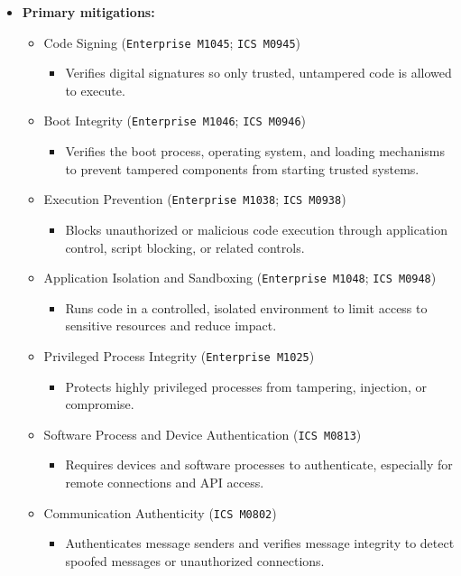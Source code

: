 \documentclass[10pt,a4paper,oneside]{report}
\begin{document}
\begin{itemize}
\item \textbf{Primary mitigations:}
\begin{itemize}
\item Code Signing (\texttt{Enterprise M1045}; \texttt{ICS M0945})
\begin{itemize}
\item Verifies digital signatures so only trusted, untampered code is allowed to execute.
\end{itemize}
\item Boot Integrity (\texttt{Enterprise M1046}; \texttt{ICS M0946})
\begin{itemize}
\item Verifies the boot process, operating system, and loading mechanisms to prevent tampered components from starting trusted systems.
\end{itemize}
\item Execution Prevention (\texttt{Enterprise M1038}; \texttt{ICS M0938})
\begin{itemize}
\item Blocks unauthorized or malicious code execution through application control, script blocking, or related controls.
\end{itemize}
\item Application Isolation and Sandboxing (\texttt{Enterprise M1048}; \texttt{ICS M0948})
\begin{itemize}
\item Runs code in a controlled, isolated environment to limit access to sensitive resources and reduce impact.
\end{itemize}
\item Privileged Process Integrity (\texttt{Enterprise M1025})
\begin{itemize}
\item Protects highly privileged processes from tampering, injection, or compromise.
\end{itemize}
\item Software Process and Device Authentication (\texttt{ICS M0813})
\begin{itemize}
\item Requires devices and software processes to authenticate, especially for remote connections and API access.
\end{itemize}
\item Communication Authenticity (\texttt{ICS M0802})
\begin{itemize}
\item Authenticates message senders and verifies message integrity to detect spoofed messages or unauthorized connections.

\end{itemize}
\end{itemize}
\end{itemize}
\end{document}
